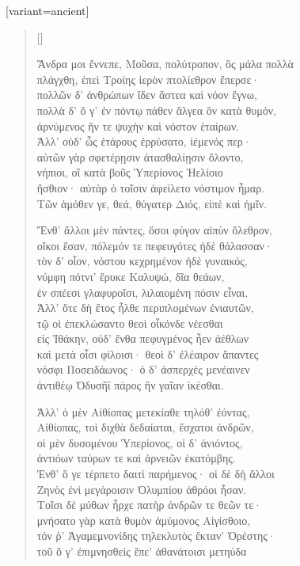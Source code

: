 \documentclass[10pt]{lecturenotes}
\begin{document}
\begin{greek}[variant=ancient]
\renewcommand{\poemtoc}{section}
\settowidth{\versewidth}{Ἄνδρα μοι ἔννεπε, Μοῦσα, πολύτροπον, ὃς μάλα πολλὰ}
\begin{verse}[\versewidth]

Ἄνδρα μοι ἔννεπε, Μοῦσα, πολύτροπον, ὃς μάλα πολλὰ\\
πλάγχθη, ἐπεὶ Τροίης ἱερὸν πτολίεθρον ἔπερσε·\\
πολλῶν δ' ἀνθρώπων ἴδεν ἄστεα καὶ νόον ἔγνω,\\
πολλὰ δ' ὅ γ' ἐν πόντῳ πάθεν ἄλγεα ὃν κατὰ θυμόν,\\
ἀρνύμενος ἥν τε ψυχὴν καὶ νόστον ἑταίρων.\\
Ἀλλ' οὐδ' ὧς ἑτάρους ἐρρύσατο, ἱέμενός περ·\\
αὐτῶν γὰρ σφετέρῃσιν ἀτασθαλίῃσιν ὄλοντο,\\
νήπιοι, οἳ κατὰ βοῦς Ὑπερίονος Ἠελίοιο\\
ἤσθιον· αὐτὰρ ὁ τοῖσιν ἀφείλετο νόστιμον ἦμαρ.\\
Τῶν ἁμόθεν γε, θεά, θύγατερ Διός, εἰπὲ καὶ ἡμῖν.

Ἔνθ' ἄλλοι μὲν πάντες, ὅσοι φύγον αἰπὺν ὄλεθρον,\\
οἴκοι ἔσαν, πόλεμόν τε πεφευγότες ἠδὲ θάλασσαν·\\
τὸν δ' οἶον, νόστου κεχρημένον ἠδὲ γυναικός,\\
νύμφη πότνι' ἔρυκε Καλυψώ, δῖα θεάων,\\
ἐν σπέεσι γλαφυροῖσι, λιλαιομένη πόσιν εἶναι.\\
Ἀλλ' ὅτε δὴ ἔτος ἦλθε περιπλομένων ἐνιαυτῶν,\\
τῷ οἱ ἐπεκλώσαντο θεοὶ οἶκόνδε νέεσθαι\\
εἰς Ἰθάκην, οὐδ' ἔνθα πεφυγμένος ἦεν ἀέθλων\\
καὶ μετὰ οἷσι φίλοισι· θεοὶ δ' ἐλέαιρον ἅπαντες\\
νόσφι Ποσειδάωνος· ὁ δ' ἀσπερχὲς μενέαινεν\\
ἀντιθέῳ Ὀδυσῆϊ πάρος ἣν γαῖαν ἱκέσθαι.

Ἀλλ' ὁ μὲν Αἰθίοπας μετεκίαθε τηλόθ' ἐόντας,\\
Αἰθίοπας, τοὶ διχθὰ δεδαίαται, ἔσχατοι ἀνδρῶν,\\
οἱ μὲν δυσομένου Ὑπερίονος, οἱ δ' ἀνιόντος,\\
ἀντιόων ταύρων τε καὶ ἀρνειῶν ἑκατόμβης. \\
Ἐνθ' ὅ γε τέρπετο δαιτὶ παρήμενος· οἱ δὲ δὴ ἄλλοι\\
Ζηνὸς ἐνὶ μεγάροισιν Ὀλυμπίου ἁθρόοι ἦσαν.\\
Τοῖσι δὲ μύθων ἦρχε πατὴρ ἀνδρῶν τε θεῶν τε·\\
μνήσατο γὰρ κατὰ θυμὸν ἀμύμονος Αἰγίσθοιο,\\
τόν ῥ' Ἀγαμεμνονίδης τηλεκλυτὸς ἔκταν' Ὀρέστης· \\
τοῦ ὅ γ' ἐπιμνησθεὶς ἔπε' ἀθανάτοισι μετηύδα


\end{verse}
\end{greek}
\end{document}
